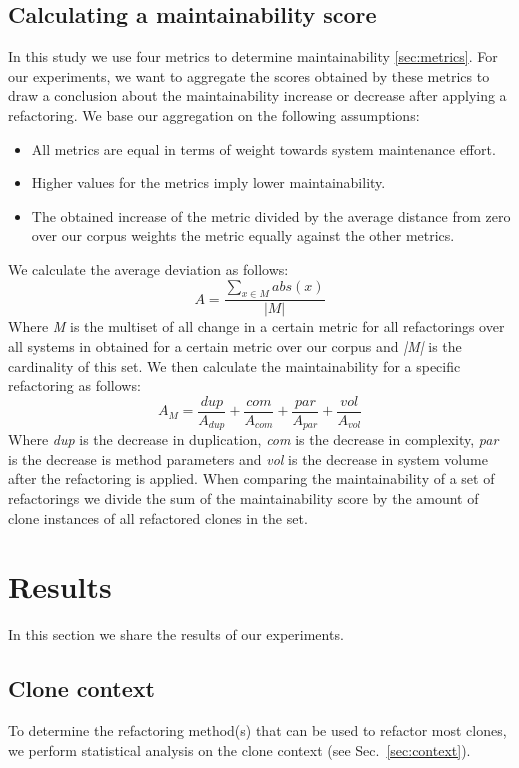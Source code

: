 \documentclass[sigconf,review]{acmart}
\begin{document}
\subsection{Calculating a maintainability score}
In this study we use four metrics to determine maintainability \ref{sec:metrics}. For our experiments, we want to aggregate the scores obtained by these metrics to draw a conclusion about the maintainability increase or decrease after applying a refactoring. We base our aggregation on the following assumptions:
\begin{itemize}
  \item All metrics are equal in terms of weight towards system maintenance effort.
  \item Higher values for the metrics imply lower maintainability.
  \item The obtained increase of the metric divided by the average distance from zero over our corpus weights the metric equally against the other metrics.
\end{itemize}
We calculate the average deviation as follows:
\begin{equation}\label{eq:scoredev}
A = \frac{\sum_{x \in M} abs(x)}{|M|}
\end{equation}
Where \textit{M} is the multiset of all change in a certain metric for all refactorings over all systems in  obtained for a certain metric over our corpus and \textit{|M|} is the cardinality of this set. We then calculate the maintainability for a specific refactoring as follows:
\begin{equation}\label{eq:scoreref}
A_M = \frac{dup}{A_{dup}} + \frac{com}{A_{com}} + \frac{par}{A_{par}} + \frac{vol}{A_{vol}}
\end{equation}
Where \textit{dup} is the decrease in duplication, \textit{com} is the decrease in complexity, \textit{par} is the decrease is method parameters and \textit{vol} is the decrease in system volume after the refactoring is applied. When comparing the maintainability of a set of refactorings we divide the sum of the maintainability score by the amount of clone instances of all refactored clones in the set.

\section{Results}
In this section we share the results of our experiments.

\subsection{Clone context}
To determine the refactoring method(s) that can be used to refactor most clones, we perform statistical analysis on the clone context (see Sec.~\ref{sec:context}).
\end{document}
